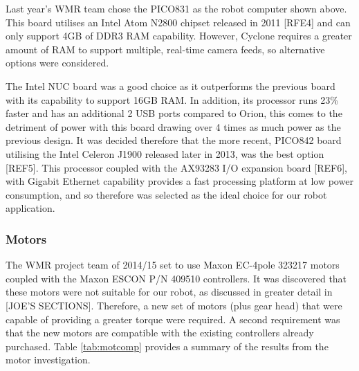 Last year's WMR team chose the PICO831 as the robot computer shown above. This board utilises an Intel Atom N2800 chipset released in 2011 [RFE4] and can only support 4GB of DDR3 RAM capability. However, Cyclone requires a greater amount of RAM to support multiple, real-time camera feeds, so alternative options were considered.\par

The Intel NUC board was a good choice as it outperforms the previous board with its capability to support 16GB RAM. In addition, its processor runs 23\% faster and has an additional 2 USB ports compared to Orion, this comes to the detriment of power with this board drawing over 4 times as much power as the previous design. It was decided therefore that the more recent, PICO842 board utilising the Intel Celeron J1900 released later in 2013, was the best option [REF5]. This processor coupled with the AX93283 I/O expansion board [REF6], with Gigabit Ethernet capability provides a fast processing platform at low power consumption, and so therefore was selected as the ideal choice for our robot application.\par

\subsubsection{Motors}
The WMR project team of 2014/15 set to use Maxon EC-4pole 323217 motors coupled with the Maxon ESCON P/N 409510 controllers. It was discovered that these motors were not suitable for our robot, as discussed in greater detail in [JOE’S SECTIONS]. Therefore, a new set of motors (plus gear head) that were capable of providing a greater torque were required. A second requirement was that the new motors are compatible with the existing controllers already purchased. Table \ref{tab:motcomp} provides a summary of the results from the motor investigation.\par

